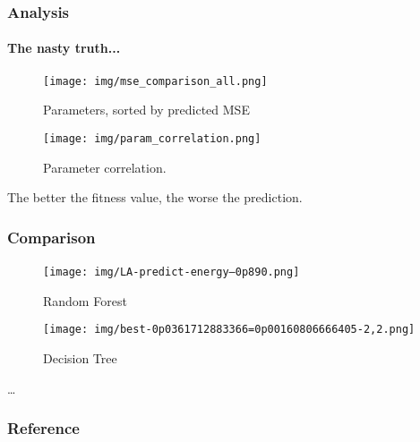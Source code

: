 \documentclass{beamer}
\begin{document}
\begin{frame}[fragile]
\frametitle{Analysis}
\framesubtitle{The nasty truth...}
\begin{figure}[H]

\begin{minipage}{.5\textwidth}
  \centering
  \texttt{[image: img/mse\_comparison\_all.png]}
  \caption{Parameters, sorted by predicted MSE}
\end{minipage}%
\begin{minipage}{.5\textwidth}
  \centering
  \texttt{[image: img/param\_correlation.png]}
  \caption{Parameter correlation.}
\end{minipage}%
\end{figure}
\hbox{}
The better the fitness value, the worse the prediction.

\end{frame}



\begin{frame}[fragile]
\frametitle{Comparison}
\framesubtitle{}

\begin{figure}[H]

\begin{minipage}{.5\textwidth}
  \centering
  \texttt{[image: img/LA-predict-energy--0p890.png]}
  \caption{Random Forest}
\end{minipage}%
\begin{minipage}{.5\textwidth}
  \centering
  \texttt{[image: img/best-0p0361712883366=0p00160806666405-2,2.png]}
  \caption{Decision Tree}
\end{minipage}%
\end{figure}
\hbox{}
\dots

\end{frame}


\begin{frame}
\frametitle{Reference}



\end{frame}



\end{document}
